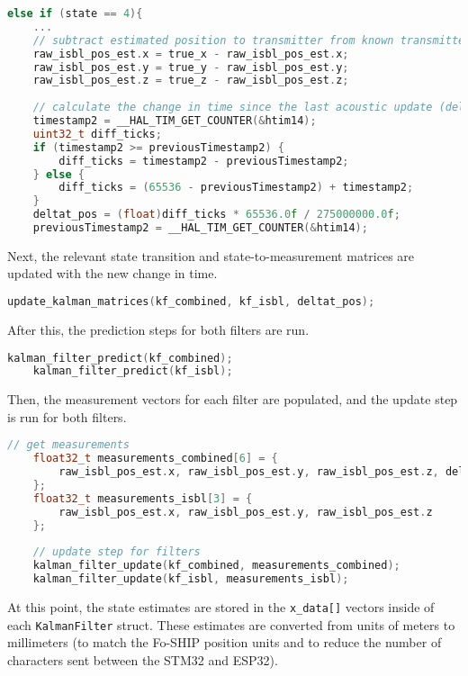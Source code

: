 \documentclass[12pt,a4paper]{report}
\begin{document}
\begin{lstlisting}[language=C++]
else if (state == 4){
	...
	// subtract estimated position to transmitter from known transmitter location to get receiver position in global frame
	raw_isbl_pos_est.x = true_x - raw_isbl_pos_est.x;
	raw_isbl_pos_est.y = true_y - raw_isbl_pos_est.y;
	raw_isbl_pos_est.z = true_z - raw_isbl_pos_est.z;
	
	// calculate the change in time since the last acoustic update (deltat_pos)
	timestamp2 = __HAL_TIM_GET_COUNTER(&htim14);
	uint32_t diff_ticks;
	if (timestamp2 >= previousTimestamp2) {
		diff_ticks = timestamp2 - previousTimestamp2;
	} else {
		diff_ticks = (65536 - previousTimestamp2) + timestamp2;
	}
	deltat_pos = (float)diff_ticks * 65536.0f / 275000000.0f;
	previousTimestamp2 = __HAL_TIM_GET_COUNTER(&htim14);
\end{lstlisting}

Next, the relevant state transition and state-to-measurement matrices are updated with the new change in time.

\begin{lstlisting}[language=C++]
	update_kalman_matrices(kf_combined, kf_isbl, deltat_pos);
\end{lstlisting}

After this, the prediction steps for both filters are run.

\begin{lstlisting}[language=C++]
	kalman_filter_predict(kf_combined);
	kalman_filter_predict(kf_isbl);
\end{lstlisting}

Then, the measurement vectors for each filter are populated, and the update step is run for both filters.

\begin{lstlisting}[language=C++]
	// get measurements
	float32_t measurements_combined[6] = {
		raw_isbl_pos_est.x, raw_isbl_pos_est.y, raw_isbl_pos_est.z, delta_x_imu.x, delta_x_imu.y, delta_x_imu.z
	};
	float32_t measurements_isbl[3] = {
		raw_isbl_pos_est.x, raw_isbl_pos_est.y, raw_isbl_pos_est.z
	};
	
	// update step for filters
	kalman_filter_update(kf_combined, measurements_combined);
	kalman_filter_update(kf_isbl, measurements_isbl);
\end{lstlisting}

At this point, the state estimates are stored in the \verb|x_data[]| vectors inside of each \verb|KalmanFilter| struct. These estimates are converted from units of meters to millimeters (to match the Fo-SHIP position units and to reduce the number of characters sent between the STM32 and ESP32). 
\end{document}
